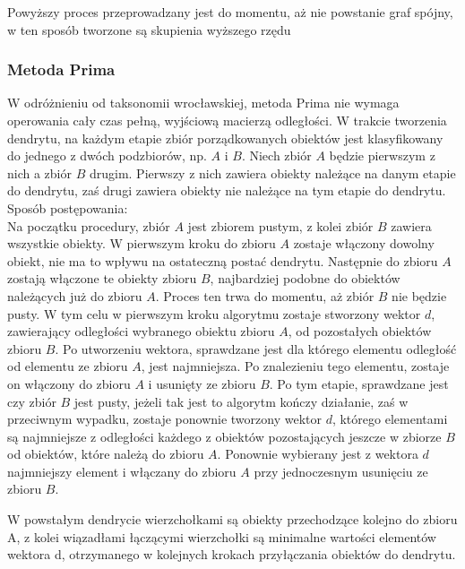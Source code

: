 \documentclass[12pt,a4paper]{report}
\begin{document}
Powyższy proces przeprowadzany jest do momentu, aż nie powstanie graf spójny, w ten sposób tworzone są skupienia wyższego rzędu 

\subsubsection{Metoda Prima}
\noindent

W odróżnieniu od taksonomii wrocławskiej, metoda Prima nie wymaga operowania cały czas pełną, wyjściową macierzą odległości. W trakcie tworzenia dendrytu, na każdym etapie zbiór porządkowanych obiektów jest klasyfikowany do jednego z dwóch podzbiorów, np. $A$ i $B$. Niech zbiór $A$ będzie pierwszym z nich a zbiór $B$ drugim. Pierwszy z nich zawiera obiekty należące na danym etapie do dendrytu, zaś drugi zawiera obiekty nie należące na tym etapie do dendrytu.\\
Sposób postępowania:\\
Na początku procedury, zbiór $A$ jest zbiorem pustym, z kolei zbiór $B$ zawiera wszystkie obiekty. W pierwszym kroku do zbioru $A$ zostaje włączony dowolny obiekt, nie ma to wpływu na ostateczną postać dendrytu. Następnie do zbioru $A$ zostają włączone te obiekty zbioru $B$, najbardziej podobne do obiektów należących już do zbioru $A$. Proces ten trwa do momentu, aż zbiór $B$ nie będzie pusty.  W tym celu w pierwszym kroku algorytmu zostaje stworzony wektor $d$, zawierający odległości wybranego obiektu zbioru $A$, od pozostałych obiektów zbioru $B$. Po utworzeniu wektora, sprawdzane jest dla którego elementu odległość od elementu ze zbioru $A$, jest najmniejsza. Po znalezieniu tego elementu, zostaje on włączony do zbioru $A$ i usunięty ze zbioru $B$. Po tym etapie, sprawdzane jest czy zbiór $B$ jest pusty, jeżeli tak jest to algorytm kończy działanie, zaś w przeciwnym wypadku, zostaje ponownie tworzony wektor $d$, którego elementami są najmniejsze z odległości każdego z obiektów pozostających jeszcze w zbiorze $B$ od obiektów, które należą do zbioru $A$. Ponownie wybierany jest z wektora $d$ najmniejszy element i włączany do zbioru $A$ przy jednoczesnym usunięciu ze zbioru $B$. 

W powstałym dendrycie wierzchołkami są obiekty przechodzące kolejno do zbioru A, z kolei wiązadłami łączącymi wierzchołki są minimalne wartości elementów wektora d, otrzymanego w kolejnych krokach przyłączania obiektów do dendrytu. 
\end{document}
